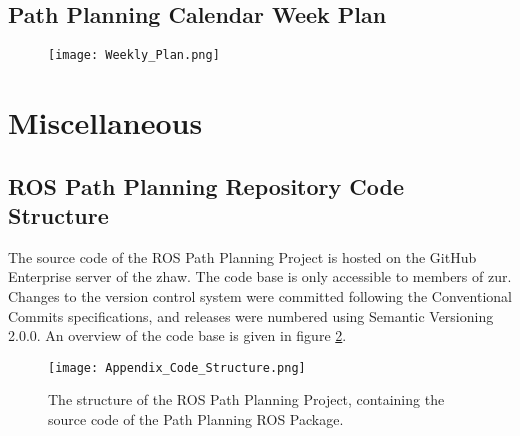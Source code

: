 

\subsection{Path Planning Calendar Week Plan} \label{sec:Appendix Path Planning Calendar Week Plan}
\begin{figure}[H]
    \centering
    \texttt{[image: Weekly\_Plan.png]}
    \label{fig:Weekly Plan}
\end{figure}

\pagebreak




\section{Miscellaneous} \label{sec:Appendix Miscellaneous}

\subsection{ROS Path Planning Repository \newline Code Structure} \label{sec:Appendix Code Structure}
The source code of the ROS Path Planning Project is hosted on the GitHub Enterprise server of the \acrshort{zhaw}. \cite{ros_path_planning_github}
The code base is only accessible to members of \acrlong{zur}. Changes to the version control system were committed following the Conventional Commits specifications, and releases were numbered using Semantic Versioning 2.0.0. \cite{conventional_commits} \cite{semantic_versioning}
An overview of the code base is given in figure \ref{fig:Appendix Code Structure}.
\begin{figure}[H]
    \centering
    \texttt{[image: Appendix\_Code\_Structure.png]}
    \caption{The structure of the ROS Path Planning Project, containing the source code of the Path Planning ROS Package.}
    \label{fig:Appendix Code Structure}
\end{figure}

